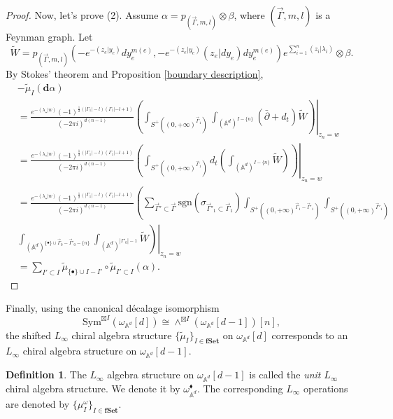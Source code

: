 \documentclass[11pt]{amsart}
\theoremstyle{definition}
\newtheorem{defn}[thm]{Definition}
\theoremstyle{remark}
\numberwithin{equation}{section}
\begin{document}
\begin{proof}
    Now, let's prove (2). Assume $\alpha=p_{(\vec{\Gamma},m,l)}\otimes\beta$, where $(\vec{\Gamma},m,l)$ is a Feynman graph. Let
    $$
    \tilde{W}=p_{(\vec{\Gamma},m,l)}(-e^{-(z_{e}| y_{e})}dy_{e}^{m(e)},-e^{-(z_{e}| y_{e})}(z_{e}|dy_{e})dy_{e}^{m(e)})e^{\sum\limits_{i=1}^{n}(z_{i}|\lambda_{i})}\otimes\beta.
    $$
    By Stokes' theorem and Proposition \ref{boundary description},
    \begin{align*}
        &-\tilde{\mu}_{ I}(\mathbf{d}\alpha)\\
        &=\frac{e^{-(\lambda_{\star}| w)}(-1)^{\frac{1}{2}(|\Gamma_{1}|-l)(\Gamma_{1}|-l+1)}}{(-2\pi i)^{d(n-1)}}\left.\left(\int_{S^{+}((0,+\infty)^{\vec{\Gamma}_{1}})}\int_{(\mathbb{A}^{d})^{ I-\{n\}}}(\bar{\partial}+d_t)\tilde{W}\right)\right|_{z_n=w}\\
        &=
        \frac{e^{-(\lambda_{\star}| w)}(-1)^{\frac{1}{2}(|\Gamma_{1}|-l)(\Gamma_{1}|-l+1)}}{(-2\pi i)^{d(n-1)}}\left.\left(\int_{S^{+}((0,+\infty)^{\vec{\Gamma}_{1}})}d_{t}\left(\int_{(\mathbb{A}^{d})^{ I-\{n\}}}\tilde{W}\right)\right)\right|_{z_n=w}\\
        &=
        \frac{e^{-(\lambda_{\star}| w)}(-1)^{\frac{1}{2}(|\Gamma_{1}|-l)(\Gamma_{1}|-l+1)}}{(-2\pi i)^{d(n-1)}}\left(\sum_{\vec{\Gamma}'\subset \vec{\Gamma}}\mathrm{sgn}(\sigma_{\vec{\Gamma}'_{1}\subset \vec{\Gamma}_{1}})\int_{S^{+}((0,+\infty)^{\vec{\Gamma}_{1}- \vec{\Gamma}'_{1}})}\int_{S^{+}((0,+\infty)^{\vec{\Gamma}'_{1}})}\right.\\
        &
        \left.\left.\int_{(\mathbb{A}^{d})^{\{\bullet\}\cup\vec{\Gamma}_{0}-\vec{\Gamma}'_{0}-\{n\}}}\int_{(\mathbb{A}^{d})^{|\Gamma'_{0}|-1}}\tilde{W}\right)\right|_{z_n=w}\\
        &=
        \sum_{ I'\subset I}\tilde{\mu}_{\{\bullet\}\cup I- I'}\circ \tilde{\mu}_{ I'\subset I}(\alpha).
    \end{align*}
\end{proof}

Finally, using the canonical d\'{e}calage isomorphism
$$
\mathrm{Sym}^{\boxtimes I}(\omega_{\mathbb{A}^{d}}[d])\cong \wedge^{\boxtimes I}(\omega_{\mathbb{A}^{d}}[d-1])[n],
$$
the shifted $L_{\infty}$ chiral algebra structure $\{\tilde{\mu}_{ I}\}_{ I\in \mathbf{fSet}}$ on $\omega_{\mathbb{A}^{d}}[d]$ corresponds to an $L_{\infty}$ chiral algebra structure on $\omega_{\mathbb{A}^{d}}[d-1]$.
\begin{defn}
  The $L_{\infty}$ algebra structure on $\omega_{\mathbb{A}^{d}}[d-1]$ is called the \textit{unit} $L_{\infty}$ chiral
  algebra structure. We denote it by $\omega_{\mathbb{A}^d}^{\blacklozenge}$. The corresponding $L_{\infty}$ operations are
  denoted by $\{\mu^{\omega}_{ I}\}_{ I\in \mathbf{fSet}}$. 
\end{defn}
\end{document}
